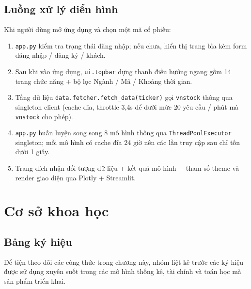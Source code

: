 \documentclass[12pt,a4paper,openany,oneside]{report}
\numberwithin{equation}{chapter}
\begin{document}
\section{Luồng xử lý điển hình}

\indent Khi người dùng mở ứng dụng và chọn một mã cổ phiếu:

\begin{enumerate}[leftmargin=22pt,topsep=2pt,itemsep=3pt]
  \item \texttt{app.py} kiểm tra trạng thái đăng nhập; nếu chưa, hiển
   thị trang bìa kèm form đăng nhập / đăng ký / khách.
  \item Sau khi vào ứng dụng, \texttt{ui.topbar} dựng thanh điều hướng
   ngang gồm 14 trang chức năng + bộ lọc Ngành / Mã / Khoảng thời gian.
  \item Tầng dữ liệu \texttt{data.fetcher.fetch\_data(ticker)} gọi
   \texttt{vnstock} thông qua singleton client (cache đĩa, throttle 3{,}4s
   để dưới mức 20 yêu cầu / phút mà \texttt{vnstock} cho phép).
  \item \texttt{app.py} huấn luyện song song 8 mô hình thông qua
   \texttt{ThreadPoolExecutor} singleton; mỗi mô hình có cache đĩa 24
   giờ nên các lần truy cập sau chỉ tốn dưới 1 giây.
  \item Trang đích nhận đối tượng dữ liệu + kết quả mô hình + tham số
   theme và render giao diện qua Plotly + Streamlit.
\end{enumerate}

\chapter{Cơ sở khoa học}

\section{Bảng ký hiệu}

\indent Để tiện theo dõi các công thức trong chương này, nhóm liệt kê
trước các ký hiệu được sử dụng xuyên suốt trong các mô hình thống kê,
tài chính và toán học mà sản phẩm triển khai.
\end{document}
